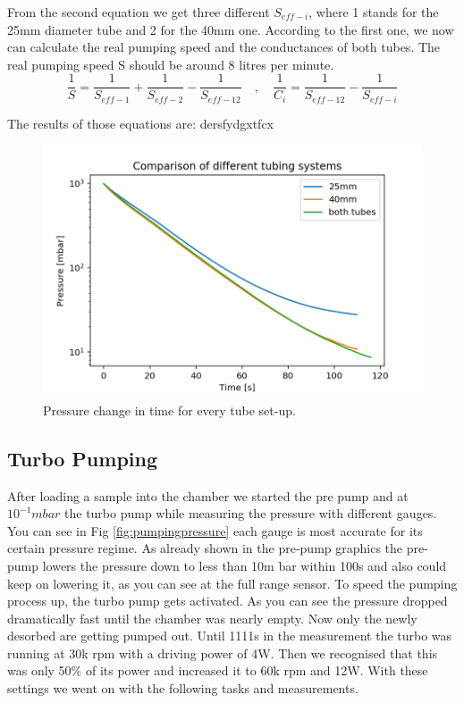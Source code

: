 \documentclass[]{article}
\begin{document}
From the second equation we get three different $S_{eff-i}$, where 1 stands for the 25mm diameter tube and 2 for the 40mm one. According to the first one, we now can calculate the real pumping speed and the conductances of both tubes. The real pumping speed S should be around 8 litres per minute.
\[ \frac{1}{S} = \frac{1}{S_{eff-1}} + \frac{1}{S_{eff-2}} -\frac{1}{S_{eff-12}} \quad , \quad
\frac{1}{C_i} = \frac{1}{S_{eff-12}} - \frac{1}{S_{eff-i}} \]

The results of those equations are: dersfydgxtfcx

\begin{figure}[!h]
\centering\includegraphics[width=.75\textwidth]{Plots/Comparison.png}
\caption{Pressure change in time for every tube set-up.}
\label{fig::comparison}
\end{figure}


\subsection{Turbo Pumping}
After loading a sample into the chamber we started the pre pump and at $10^{-1}mbar$ the turbo pump while measuring the pressure with different gauges. You can see in Fig \ref{fig:pumpingpressure} each gauge is most accurate for its certain pressure regime.
As already shown in the pre-pump graphics the pre-pump lowers the pressure down to less than 10m bar within 100s and also could keep on lowering it, as you can see at the full range sensor. To speed the pumping process up, the turbo pump gets activated. As you can see the pressure dropped dramatically fast until the chamber was nearly empty. Now only the newly desorbed are getting pumped out. Until 1111s in the measurement the turbo was running at 30k rpm with a driving power of 4W. Then we recognised that this was only 50\% of its power and increased it to 60k rpm and 12W. With these settings we went on with the following tasks and measurements.
\end{document}
